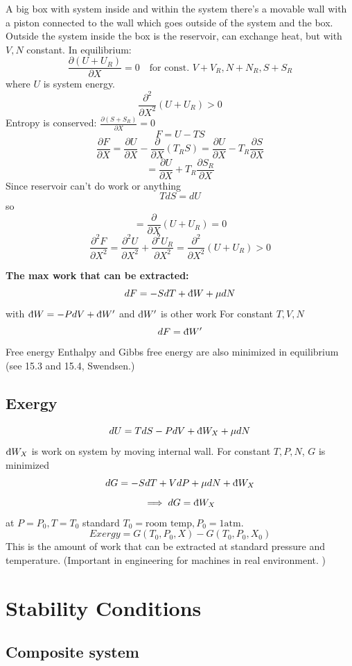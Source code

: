 \documentclass[11pt]{book}
\theoremstyle{definition}
\begin{document}
 A big box with system inside and within the system there's a movable wall with a piston connected to the wall which goes outside of the system and the box. Outside the system inside the box is the reservoir, can exchange heat, but with $ V,N $ constant.
 In equilibrium:
 \[ \frac{\partial (U+U_R)}{\partial X} = 0 \quad \text{for const. } V+V_R, N+N_R, S+S_R\] 
 where $ U $ is system energy.
 \[ \frac{\partial ^2}{\partial X^2} (U+U_R) > 0 \] 
 Entropy is conserved: $ \frac{\partial (S+S_R)}{\partial X} = 0 $ 
 \[ F = U -TS \] 
 \[ \frac{\partial F}{\partial X} = \frac{\partial U}{\partial X} - \frac{\partial }{\partial X}\left(T_R S \right) = \frac{\partial U}{\partial X} - T_R \frac{\partial S}{\partial X}  \] 
 \[ = \frac{\partial U}{\partial X} + T_R \frac{\partial S_R}{\partial X} \] 
 Since reservoir can't do work or anything
 \[ TdS = dU \] 
 so 
 \[ = \frac{\partial }{\partial X} (U+U_R) = 0 \] 
 \[ \frac{\partial ^2F}{\partial X^2} = \frac{\partial ^2U}{\partial X^2} + \frac{\partial ^2 U_R}{\partial X^2} = \frac{\partial ^2}{\partial X^2}(U+U_R) > 0 \] 

\textbf{The max work that can be extracted:} 
\[ dF = -SdT + \text{\dj}W + \mu dN \] 
with $ \text{\dj}W = -PdV + \text{\dj}W' $ and $ \text{\dj}W' $ is other work 
For constant $ T,V,N $ 
\[ dF = \text{\dj}W' \] Free energy 
Enthalpy and Gibbs free energy are also minimized in equilibrium (see 15.3 and 15.4, Swendsen.)

\subsection{Exergy}
\[ dU = TdS - PdV + \text{\dj}W_X + \mu dN \] $ \text{\dj}W_X $ is work on system by moving internal wall.
For constant $ T,P,N $, $ G $ is minimized
\[ dG =  -SdT +VdP + \mu dN + \text{\dj}W_X \] 
\[ \implies dG = \text{\dj}W_X \] 
at $ P=P_0, T=T_0 $ standard $ T_0= \text{room temp} , P_0 = 1 \text{atm.}$ 
\[ Exergy = G(T_0,P_0,X) - G(T_0,P_0,X_0) \] 
This is the amount of work that can be extracted at standard pressure and temperature. (Important in engineering for machines in real environment. )

\pagebreak
\section{Stability Conditions}
\subsection{Composite system}
\end{document}
